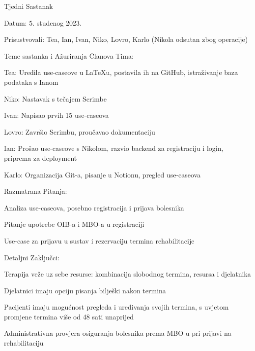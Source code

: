 \begin{packed_enum}
        \item Tjedni Sastanak
    \item[] \begin{packed_item}
        \item Datum: 5. studenog 2023.
        \item Prisustvovali: Tea, Ian, Ivan, Niko, Lovro, Karlo (Nikola odsutan zbog operacije)
        \item Teme sastanka i Ažuriranja Članova Tima:
            \begin{packed_item}
                \item Tea: Uredila use-caseove u LaTeXu, postavila ih na GitHub, istraživanje baza podataka s Ianom
                \item Niko: Nastavak s tečajem Scrimbe
                \item Ivan: Napisao prvih 15 use-caseova
                \item Lovro: Završio Scrimbu, proučavao dokumentaciju
                \item Ian: Prošao use-caseove s Nikolom, razvio backend za registraciju i login, priprema za deployment
                \item Karlo: Organizacija Git-a, pisanje u Notionu, pregled use-caseova
            \end{packed_item}
        \item Razmatrana Pitanja:
            \begin{packed_item}
                \item Analiza use-caseova, posebno registracija i prijava bolesnika
                \item Pitanje upotrebe OIB-a i MBO-a u registraciji
                \item Use-case za prijavu u sustav i rezervaciju termina rehabilitacije
            \end{packed_item}
        \item Detaljni Zaključci:
            \begin{packed_item}
                \item Terapija veže uz sebe resurse: kombinacija slobodnog termina, resursa i djelatnika
                \item Djelatnici imaju opciju pisanja bilješki nakon termina
                \item Pacijenti imaju mogućnost pregleda i uređivanja svojih termina, s uvjetom promjene termina više od 48 sati unaprijed
                \item Administrativna provjera osiguranja bolesnika prema MBO-u pri prijavi na rehabilitaciju

\end{packed_item}
\end{packed_item}
\end{packed_enum}
